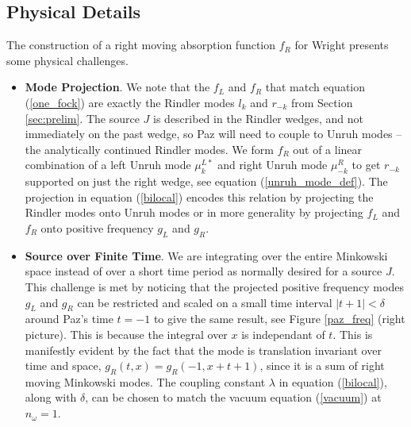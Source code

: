 \documentclass[12pt,a4paper]{article}
\begin{document}
{\subsection{Physical Details} \label{sec:drive_phy}

The construction of a right moving absorption function $f_R$ for Wright presents some physical challenges.

\begin{itemize}
\item {\bf Mode Projection}. We note that the $f_L$ and $f_R$ that match equation (\ref{one_fock}) are exactly the Rindler modes $l_k$ and $r_{-k}$ from Section \ref{sec:prelim}. The source $J$ is described in the Rindler wedges, and not immediately on the past wedge, so Paz will need to couple to Unruh modes -- the analytically continued Rindler modes.  We form $f_R$ out of a linear combination of a left Unruh mode $\mu^{L*}_{k}$ and right Unruh mode $\mu^R_{-k}$ to get $r_{-k}$ supported on just the right wedge, see equation (\ref{unruh_mode_def}).  The projection in equation (\ref{bilocal}) encodes this relation by projecting the Rindler modes onto Unruh modes or in more generality by projecting $f_L$ and $f_R$ onto positive frequency $g_L$ and $g_R$.

\item{\bf Source over Finite Time}. We are integrating over the entire Minkowski space instead of over a short time period as normally desired for a source $J$.  This challenge is met by noticing that the projected positive frequency modes $g_L$ and $g_R$ can be restricted and scaled on a small time interval $|t + 1| < \delta$ around Paz's time $t=-1$ to give the same result, see Figure \ref{paz_freq} (right picture). This is because the integral over $x$ is independant of $t$. This is manifestly evident by the fact that the mode is translation invariant over time and space, $g_R(t,x) = g_R(-1,x+t+1)$, since it is a sum of right moving Minkowski modes. The coupling constant $\lambda$ in equation (\ref{bilocal}), along with $\delta$, can be chosen to match the vacuum equation (\ref{vacuum}) at $n_\omega = 1$.


\end{itemize}}
\end{document}
